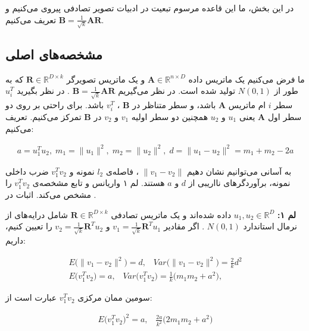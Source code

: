 در این بخش، ما این قاعده مرسوم تبعیت در ادبیات تصویر تصادفی 
\cite{litez166}
پیروی می‌کنیم و تعریف می‌کنیم
$\mathbf{B} = \frac{1}{\sqrt{k}} \mathbf{A} \mathbf{R}$.

\subsection{
مشخصه‌های اصلی
}

ما فرض می‌کنیم یک ماتریس داده 
$\mathbf{A} \in \mathbb{R}^{n \times D}$
و یک ماتریس تصویرگر
$\mathbf{R} \in \mathbb{R}^{D \times k}$
که به طور 
از 
$N(0,1)$
تولید شده است. در نظر می‌گیریم
$\mathbf{B} = \frac{1}{\sqrt{k}} \mathbf{A} \mathbf{R}$
.
در نظر بگیرید
$u_i^T$
سطر
$i$
ام ماتریس 
$\mathbf{A}$
باشد، و سطر متناظر در 
$\mathbf{B}$
،
$v_i^T$
باشد.
برای راحتی بر روی دو سطر اول 
$\mathbf{A}$
یعنی 
$u_1$
و
$u_2$
همچنین دو سطر اولیه
$v_1$
و 
$v_2$
در 
$\mathbf{B}$
تمرکز می‌کنیم. تعریف می‌کنیم:

\begin{align}
a= u_1^T u_2, \; m_1 = \|u_1 \|^2, \; m_2 = \| u_2 \|^2, \; d =  \| u_1 - u_2 \|^2 = m_1 + m_2 - 2a
\label{eq:1i7}
\end{align}

به آسانی می‌توانیم نشان دهیم 
$\| v_1 - v_2 \|$
، فاصله‌ی 
$l_2$
نمونه و 
$v_1^T v_2$
ضرب داخلی نمونه، برآوردگرهای نااریبی از 
$d$
و 
$a$
هستند. لم ۱ واریانس و تابع مشخصه‌ی 
$v_1^T v_2$
را مشخص می‌‌کند. اثبات در 
\cite{li2007stable}
.

\textbf{لم ۱:}
$u_1, u_2 \in \mathbb{R}^D$
داده شده‌اند و یک ماتریس تصادفی
$\mathbf{R} \in \mathbb{R}^{D \times k}$
شامل درایه‌های 
از نرمال استاندارد
$N(0,1)$
. اگر مقادیر 
$v_1 = \frac{1}{\sqrt{k}} \mathbf{R}^T u_1$
و 
$v_2 = \frac{1}{\sqrt{k}} \mathbf{R}^T u_2$
را تعیین کنیم، داریم:

\begin{align}
E \big(  \| v_1 - v_2 \|^2 \big) = d, \;\;\; \mathit{Var}\big(\| v_1 - v_2 \|^2\big) = \frac{2}{k} d^2  \label{eq:1i8}\\
E \big( v_1^T v_2 \big) = a, \;\;\; \mathit{Var} \big(v_1^T v_2 \big) =  \frac{1}{k} \big(m_1 m_2 + a^2\big), \label{eq:1i9}
\end{align}

سومین ممان مرکزی 
$v_1^T v_2$
عبارت است از:

\begin{align}
E \big( v_1^T v_2 \big)^2 = a, \;\;\; \frac{2a}{k^2} \big( 2 m_1 m_2 + a^2 \big)
\label{eq:1iA}
\end{align}

